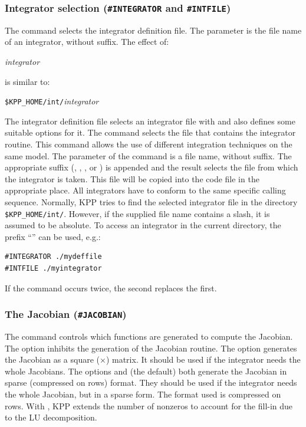 \documentclass[twoside]{article}
\begin{document}
\subsubsection{Integrator selection ({\tt\#INTEGRATOR} and
  {\tt\#INTFILE})}
\label{sec:command-integrator-intfile}

The  command selects the integrator definition file.
The parameter is the file name of an integrator, without suffix. The
effect of:

 {\it integrator}

is similar to:

 \verb|$KPP_HOME/int/|{\it integrator}

The integrator definition file selects an integrator file with
 and also defines some suitable options for it. The
 command selects the file that contains the integrator
routine. This command allows the use of different integration techniques
on the same model. The parameter of the command is a file name, without
suffix. The appropriate suffix (, , , or
) is appended and the result selects the file from which the
integrator is taken. This file will be copied into the code file in the
appropriate place. All integrators have to conform to the same specific
calling sequence. Normally, KPP tries to find the selected integrator
file in the directory \verb|$KPP_HOME/int/|. However, if the supplied
file name contains a slash, it is assumed to be absolute. To access an
integrator in the current directory, the prefix ``'' can be
used, e.g.:
%
\begin{verbatim}
#INTEGRATOR ./mydeffile
#INTFILE ./myintegrator
\end{verbatim}
%
If the  command occurs twice, the second replaces the
first.

\subsubsection{The Jacobian ({\tt\#JACOBIAN})}
\label{sec:command-jacobian}

The  command controls which functions are generated to
compute the Jacobian. The option  inhibits the generation of
the Jacobian routine. The option  generates the Jacobian as a
square ($\times$) matrix. It should be used if the
integrator needs the whole Jacobians. The options  and
 (the default) both generate the Jacobian in sparse
(compressed on rows) format.  They should be used if the integrator
needs the whole Jacobian, but in a sparse form. The format used is
compressed on rows. With , KPP extends the number of
nonzeros to account for the fill-in due to the LU decomposition.
\end{document}
